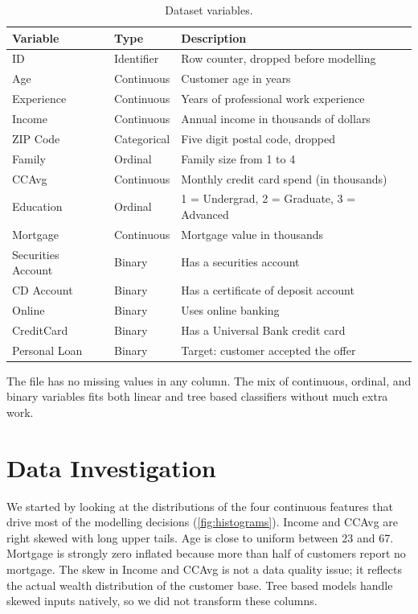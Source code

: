 \documentclass[11pt, a4paper]{article}
\begin{document}
\begin{table}[!htbp]
\centering
\caption{Dataset variables.}
\label{tab:features}
\begin{tabular}{@{} l l p{8.0cm} @{}}
\toprule
Variable & Type & Description \\
\midrule
ID                 & Identifier  & Row counter, dropped before modelling \\
Age                & Continuous  & Customer age in years \\
Experience         & Continuous  & Years of professional work experience \\
Income             & Continuous  & Annual income in thousands of dollars \\
ZIP Code           & Categorical & Five digit postal code, dropped \\
Family             & Ordinal     & Family size from 1 to 4 \\
CCAvg              & Continuous  & Monthly credit card spend (in thousands) \\
Education          & Ordinal     & 1 = Undergrad, 2 = Graduate, 3 = Advanced \\
Mortgage           & Continuous  & Mortgage value in thousands \\
Securities Account & Binary      & Has a securities account \\
CD Account         & Binary      & Has a certificate of deposit account \\
Online             & Binary      & Uses online banking \\
CreditCard         & Binary      & Has a Universal Bank credit card \\
\midrule
Personal Loan      & Binary      & Target: customer accepted the offer \\
\bottomrule
\end{tabular}
\end{table}

The file has no missing values in any column. The mix of continuous,
ordinal, and binary variables fits both linear and tree based classifiers
without much extra work.

\section{Data Investigation}

We started by looking at the distributions of the four continuous features
that drive most of the modelling decisions (\autoref{fig:histograms}).
Income and CCAvg are right skewed with long upper tails. Age is close to
uniform between 23 and 67. Mortgage is strongly zero inflated because more
than half of customers report no mortgage. The skew in Income and CCAvg is
not a data quality issue; it reflects the actual wealth distribution of
the customer base. Tree based models handle skewed inputs natively, so we
did not transform these columns.
\end{document}
